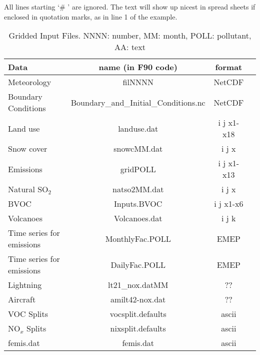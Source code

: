  All lines starting `\# ' are ignored. The text will show up nicest in
 spread sheets if enclosed in quotation marks, as in line 1 of the example.

\begin{table}[h]
\caption{Gridded Input Files. NNNN: number, MM: month, POLL: pollutant, AA: text}
\label{Tab:Inputs}
\begin{tabular}{lccc}\hline
Data & name (in F90 code) & format\\ \hline
Meteorology&filNNNN&NetCDF\\
Boundary Conditions&Boundary\_and\_Initial\_Conditions.nc&NetCDF\\
Land use&landuse.dat&i j x1-x18 \\ %
Snow cover&snowcMM.dat&i j x\\
Emissions&gridPOLL&i j x1-x13\\
Natural SO$_{2}$&natso2MM.dat&i j x\\
BVOC&Inputs.BVOC&i j x1-x6 \\ %
Volcanoes&Volcanoes.dat&i j k   \\ %
Time series for emissions&MonthlyFac.POLL&EMEP\\
Time series for emissions&DailyFac.POLL&EMEP\\
Lightning&lt21\_nox.datMM&??& \\
Aircraft&amilt42-nox.dat&??&\\
VOC Splits&vocsplit.defaults&ascii \\
NO$_{x}$ Splits& nixsplit.defaults&ascii\\
femis.dat & femis.dat    & ascii  \\
\hline
\end{tabular}
\end{table}

